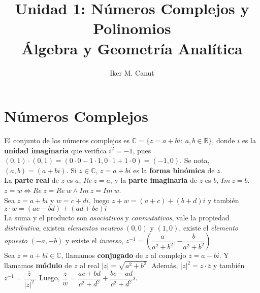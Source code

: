 \documentclass[11pt,a4paper]{article}
\author{Iker M. Canut}
\title{Unidad 1: N\'umeros Complejos y Polinomios\\\'Algebra y Geometr\'ia Anal\'itica}
\begin{document}
\maketitle
\newpage
\section{N\'umeros Complejos}
\noindent El conjunto de los n\'umeros complejos es $\mathbb{C} = \{ z = a+bi:\ a,b \in \mathbb{R}\}$, donde $i$ es la \textbf{unidad imaginaria} que verifica $i^2 = -1$, pues $(0,1)\cdot(0,1)=(0\cdot0-1\cdot1,0\cdot1+1\cdot0) = (-1,0)$. Se nota, $(a,b) = (a+bi)$. Si $z\in\mathbb{C}$, $z=a+bi$ es la \textbf{forma bin\'omica} de $z$.\\

\noindent La \textbf{parte real} de $z$ es $a$, $Re\ z = a$, y la \textbf{parte imaginaria} de $z$ es $b$, $Im\ z = b$.\\
$z = w \iff Re\ z = Re\ w \land Im\ z = Im\ w$.\\

\noindent Sea $z=a+bi$ y $w=c+di$, luego $z+w = (a+c)+(b+d)i$ y tambi\'en $z \cdot w = (ac-bd)+(ad+bc)i$\\
\noindent La suma y el producto son \textit{asociativos} y \textit{conmutativos}, vale la propiedad \textit{distributiva}, existen \textit{elementos neutros} $(0,0)$ y $(1,0)$, existe el \textit{elemento opuesto} $(-a,-b)$ y existe el \textit{inverso}, $z^{-1} = (\dfrac{a}{a^2+b^2}, -\dfrac{b}{a^2+b^2})$.\\

\noindent Sea $z=a+bi \in \mathbb{C}$, llamamos \textbf{conjugado} de $z$ al complejo $\overline{z}=a-bi$. Y llamamos \textbf{m\'odulo} de $z$ al real $|z| = \sqrt{a^2+b^2}$. Adem\'as, $|z|^2 = z\cdot\overline{z}$ y tambi\'en $z^{-1} = \dfrac{\overline{z}}{|z|^2}$. Luego, $\dfrac{z}{w} = \dfrac{ac+bd}{c^2+d^2} + \dfrac{bc-ad}{c^2+d^2}i$.
\end{document}
